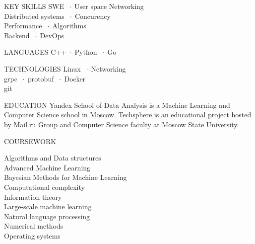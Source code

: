 \documentclass[12pt]{cutecv}
\author{Svyatoslav Feldsherov}
\newcommand{\listbullet}{$\; \cdot \;$}
\begin{document}
\maketitle

\begin{paracol}{2}
\setlength{\columnsep}{2em}
\setlength{\cvsectionverticalskip}{1mm}
\setlength{\cvinfoverticalskip}{1mm}

\begin{leftcolumn}
\begin{cvsection}{KEY SKILLS}
  SWE \listbullet User space Networking  \\
   Distributed systems \listbullet Concurency  \\
   Performance \listbullet Algorithms \\
   Backend \listbullet DevOps 
\end{cvsection}

\begin{cvsection}{LANGUAGES}
  C++\listbullet Python \listbullet Go
\end{cvsection}

\begin{cvsection}{TECHNOLOGIES}
  Linux \listbullet Networking \\
  grpc \listbullet protobuf \listbullet Docker \\
  git \\
\end{cvsection}

\begin{cvsection}{EDUCATION}
    {Yandex School of Data Analysis is a Machine Learning
     and Computer Science school in Moscow.}
   {Techsphere is an educational project hosted
    by Mail.ru Group and Computer Science faculty
    at Moscow State University.}
\end{cvsection}


\begin{cvsection}{COURSEWORK}

  {\HLight
    Algorithms and Data structures\\
    Advanced Machine Learning\\
    Bayesian Methods for Machine Learning\\
    Computational complexity\\
    Information theory\\
    Large-scale machine learning\\
    Natural language processing\\
    Numerical methods\\
    Operating systems\\
  }
\end{cvsection}


\end{leftcolumn}
\end{paracol}
\end{document}
